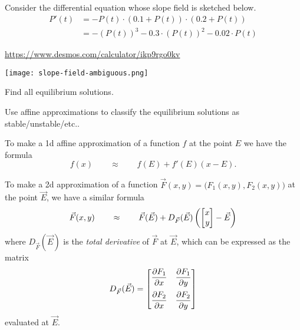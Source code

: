 \documentclass{workbook}
\begin{document}
\begin{slide}
	\question
	Consider the differential equation whose slope field is sketched below.
	\begin{align*}
		P'(t) &= -P(t)\cdot(0.1+P(t))\cdot(0.2+P(t))\\ 
		&=-(P(t))^3-0.3\cdot (P(t))^2 -0.02\cdot P(t)
	\end{align*}

	{\small \url{https://www.desmos.com/calculator/ikp9rgo0kv}}
	\begin{center}
	\texttt{[image: slope-field-ambiguous.png]}
	\end{center}


	\bigskip	
	\bigskip	
	\bigskip	
	\begin{parts}
		\item Find all equilibrium solutions.
		\item Use affine approximations to classify the equilibrium solutions as stable/unstable/etc..
	\end{parts}
\end{slide}

\begin{slide}
	\question
	To make a 1d affine approximation of a function $f$ at the point $E$ we have the formula
	\[
		f(x)\qquad \approx\qquad f(E) + f'(E)(x-E).
	\]		

	To make a 2d approximation of a function $\vec F(x,y)=\Big(F_1(x,y), F_2(x,y)\Big)$ at the point $\vec E$,
	we have a similar formula
	\[
		\vec F(x,y)\qquad \approx \qquad \vec F(\vec E) + D_{\vec F}(\vec E)\left(\mat{x\\y}-\vec E\right)
	\]
	where $D_{\vec F}(\vec E)$ is the \emph{total derivative} of $\vec F$ at $\vec E$, which can be expressed
	as the matrix
	\[
		D_{\vec F}(\vec E) = \mat{
			\rule[-0.5cm]{0pt}{.8cm}\displaystyle \frac{\partial F_1}{\partial x} &\displaystyle  \frac{\partial F_1}{\partial y}\\
			\rule[-0.2cm]{0pt}{.3cm}\displaystyle  \frac{\partial F_2}{\partial x} &\displaystyle  \frac{\partial F_2}{\partial y}
		}
	\]
	evaluated at $\vec E$.
\end{slide}
\end{document}
